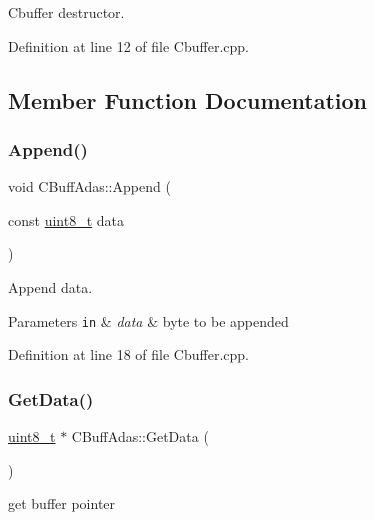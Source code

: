 Cbuffer destructor. 



Definition at line 12 of file Cbuffer.\+cpp.



\subsection{Member Function Documentation}
\mbox{\label{class_c_buff_adas_aceac4b71872e406861286959f578c89b}} 
\subsubsection{\texorpdfstring{Append()}{Append()}}
{\footnotesize\ttfamily void C\+Buff\+Adas\+::\+Append (\begin{DoxyParamCaption}\item[{const \mbox{\hyperlink{_a_d_a_s___types_8h_aba7bc1797add20fe3efdf37ced1182c5}{uint8\+\_\+t}}}]{data }\end{DoxyParamCaption})}



Append data. 


\begin{DoxyParams}[1]{Parameters}
\mbox{\tt in}  & {\em data} & byte to be appended \\
\hline
\end{DoxyParams}


Definition at line 18 of file Cbuffer.\+cpp.

\mbox{\label{class_c_buff_adas_a56fdcdc9766874d3a6fef04119ee91f9}} 
\subsubsection{\texorpdfstring{Get\+Data()}{GetData()}}
{\footnotesize\ttfamily \mbox{\hyperlink{_a_d_a_s___types_8h_aba7bc1797add20fe3efdf37ced1182c5}{uint8\+\_\+t}} $\ast$ C\+Buff\+Adas\+::\+Get\+Data (\begin{DoxyParamCaption}{ }\end{DoxyParamCaption})}



get buffer pointer 

